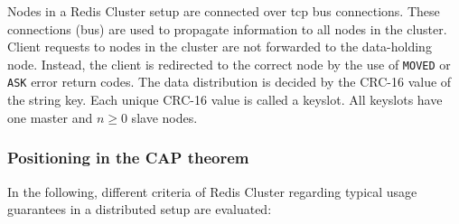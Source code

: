 Nodes in a Redis Cluster setup are connected over \gls{tcp} bus connections.
These connections (bus) are used to propagate information to all nodes in the
cluster. Client requests to nodes in the cluster are not forwarded to the
data-holding node. Instead, the client is redirected to the correct node by the
use of \texttt{MOVED} or \texttt{ASK} error return codes.
The data distribution is decided by the CRC-16 value of the string key. Each
unique CRC-16 value is called a keyslot. All keyslots have one master and
$n \geq 0$ slave nodes.
\parencite{redis:clusterSpecification}

\subsubsection*{Positioning in the CAP theorem}
In the following, different criteria of Redis Cluster regarding typical usage
guarantees in a distributed setup are evaluated:
